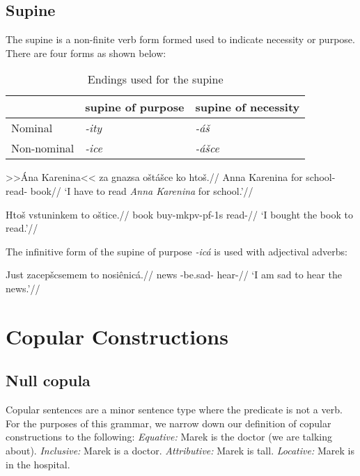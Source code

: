 \subsection{Supine}
The supine is a non-finite verb form formed used to indicate necessity or purpose. There are four forms as shown below:

\begin{table}[h!]
	\centering\small
	\caption{Endings used for the supine}
	\begin{tabularx}{0.8\textwidth}{MMM}
		\toprule
		&{\sc supine of purpose}&{\sc supine of necessity}\\
		\midrule
		Nominal & \textit{-ity} & \textit{-á\v{s}}\\
		\addlinespace
		Non-nominal & \textit{-ice} & \textit{-á\v{s}ce}\\
		\bottomrule
	\end{tabularx}
\end{table}


	\pex
\begingl
\gla >>Ána Karenina<< za gnazsa o\v{s}tá\v{s}ce ko hto\v{s}.//
\glb Anna Karenina for school- read-  book//
\glft `I have to read \textit{Anna Karenina} for school.'//
\endgl
\xe

	\pex
\begingl
\gla Hto\v{s} vstuninkem to o\v{s}tice.//
\glb book buy-mk{pv-pf-1s}  read-//
\glft `I bought the book to read.'//
\endgl
\xe

\par The infinitive form of the supine of purpose \textit{-icá} is used with adjectival adverbs:

\pex
\begingl
\gla Just zacep\v{s}csemem to nosiênicá.//
\glb news -be.sad-  hear-//
\glft `I am sad to hear the news.'//
\endgl
\xe

\section{Copular Constructions}
\subsection{Null copula}

Copular sentences are a minor sentence type where the predicate is not a verb. For the purposes of this grammar, we narrow down our definition of copular constructions to the following:
\pex
\a \textit{Equative:} Marek is the doctor (we are talking about).
\a \textit{Inclusive:} Marek is a doctor.
\a \textit{Attributive:} Marek is tall.
\a \textit{Locative:} Marek is in the hospital.
\xe

